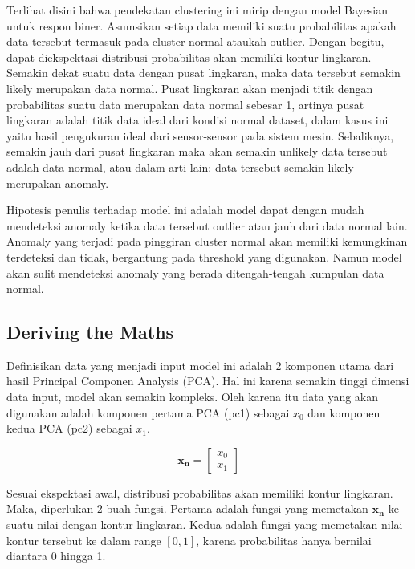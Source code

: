 Terlihat disini bahwa pendekatan clustering ini mirip dengan model Bayesian untuk respon biner. Asumsikan setiap data memiliki suatu probabilitas apakah data tersebut termasuk pada cluster normal ataukah outlier. Dengan begitu, dapat diekspektasi distribusi probabilitas akan memiliki kontur lingkaran. Semakin dekat suatu data dengan pusat lingkaran, maka data tersebut semakin likely merupakan data normal. Pusat lingkaran akan menjadi titik dengan probabilitas suatu data merupakan data normal sebesar 1, artinya pusat lingkaran adalah titik data ideal dari kondisi normal dataset, dalam kasus ini yaitu hasil pengukuran ideal dari sensor-sensor pada sistem mesin. Sebaliknya, semakin jauh dari pusat lingkaran maka akan semakin unlikely data tersebut adalah data normal, atau dalam arti lain: data tersebut semakin likely merupakan anomaly.

Hipotesis penulis terhadap model ini adalah model dapat dengan mudah mendeteksi anomaly ketika data tersebut outlier atau jauh dari data normal lain. Anomaly yang terjadi pada pinggiran cluster normal akan memiliki kemungkinan terdeteksi dan tidak, bergantung pada threshold yang digunakan. Namun model akan sulit mendeteksi anomaly yang berada ditengah-tengah kumpulan data normal.

\subsection{Deriving the Maths}

Definisikan data yang menjadi input model ini adalah 2 komponen utama dari hasil Principal Componen Analysis (PCA). Hal ini karena semakin tinggi dimensi data input, model akan semakin kompleks. Oleh karena itu data yang akan digunakan adalah komponen pertama PCA (pc1) sebagai $x_0$ dan komponen kedua PCA (pc2) sebagai $x_1$.

\begin{equation}
    \mathbf{x_n}=\begin{bmatrix} x_0 \\ x_1 \end{bmatrix}
\end{equation}

Sesuai ekspektasi awal, distribusi probabilitas akan memiliki kontur lingkaran. Maka, diperlukan 2 buah fungsi. Pertama adalah fungsi yang memetakan $\mathbf{x_n}$ ke suatu nilai dengan kontur lingkaran. Kedua adalah fungsi yang memetakan nilai kontur tersebut ke dalam range $[0,1]$, karena probabilitas hanya bernilai diantara 0 hingga 1.


